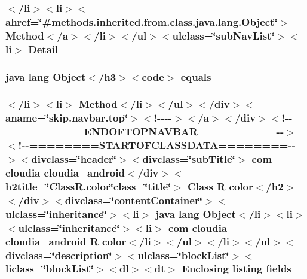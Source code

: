 \hypertarget{_r_8color_8html_aed0df2ae11502bf9389ac3cf53b1c0f6}{
\subsubsection[{Detail}]{\setlength{\rightskip}{0pt plus 5cm}$<$/li$>$$<$li$>$$<$ahref=\char`\"{}\#methods.\-inherited.\-from.\-class.\-java.\-lang.\-Object\char`\"{}$>$ Method$<$/{\bf a}$>$$<$/li$>$$<$/ul$>$$<$ulclass=\char`\"{}sub\-Nav\-List\char`\"{}$>$$<$li$>$ Detail}}\label{_r_8color_8html_aed0df2ae11502bf9389ac3cf53b1c0f6}
\hypertarget{_r_8color_8html_a8974318cea585f72df717e0380ec7104}{
\subsubsection[{equals}]{\setlength{\rightskip}{0pt plus 5cm}java lang Object$<$/h3$>$$<$code$>$ equals}}\label{_r_8color_8html_a8974318cea585f72df717e0380ec7104}
\hypertarget{_r_8color_8html_a1e955e49ef11a3495bece221a264109c}{
\subsubsection[{fields}]{\setlength{\rightskip}{0pt plus 5cm}$<$/li$>$$<$li$>$ Method$<$/li$>$$<$/ul$>$$<$/div$>$$<$aname=\char`\"{}skip.\-navbar.\-top\char`\"{}$>$$<$!-\/-\/-\/-\/$>$$<$/a$>$$<$/div$>$$<$!-\/-\/=========E\-N\-D\-O\-F\-T\-O\-P\-N\-A\-V\-B\-A\-R=========-\/-\/$>$$<$!-\/-\/========S\-T\-A\-R\-T\-O\-F\-C\-L\-A\-S\-S\-D\-A\-T\-A========-\/-\/$>$$<$divclass=\char`\"{}header\char`\"{}$>$$<$divclass=\char`\"{}sub\-Title\char`\"{}$>$ com cloudia cloudia\-\_\-android$<$/div$>$$<$h2title=\char`\"{}Class\-R.\-color\char`\"{}class=\char`\"{}title\char`\"{}$>$ Class {\bf R} {\bf color}$<$/h2$>$$<$/div$>$$<$divclass=\char`\"{}content\-Container\char`\"{}$>$$<$ulclass=\char`\"{}inheritance\char`\"{}$>$$<$li$>$ java lang Object$<$/li$>$$<$li$>$$<$ulclass=\char`\"{}inheritance\char`\"{}$>$$<$li$>$ com cloudia cloudia\-\_\-android {\bf R} {\bf color}$<$/li$>$$<$/ul$>$$<$/li$>$$<$/ul$>$$<$divclass=\char`\"{}description\char`\"{}$>$$<$ulclass=\char`\"{}block\-List\char`\"{}$>$$<$liclass=\char`\"{}block\-List\char`\"{}$>$$<$dl$>$$<${\bf dt}$>$ Enclosing listing fields}}\label{_r_8color_8html_a1e955e49ef11a3495bece221a264109c}
